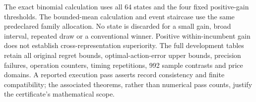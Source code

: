 The exact binomial calculation uses all 64 states and the four fixed positive-gain thresholds. The bounded-mean calculation and event staircase use the same predeclared family allocation. No state is discarded for a small gain, broad interval, repeated draw or a conventional winner. Positive within-incumbent gain does not establish cross-representation superiority. The full development tables retain all original regret bounds, optimal-action-error upper bounds, precision failures, operation counters, timing repetitions, 992 sample contrasts and price domains. A reported execution pass asserts record consistency and finite compatibility; the associated theorems, rather than numerical pass counts, justify the certificate's mathematical scope.

